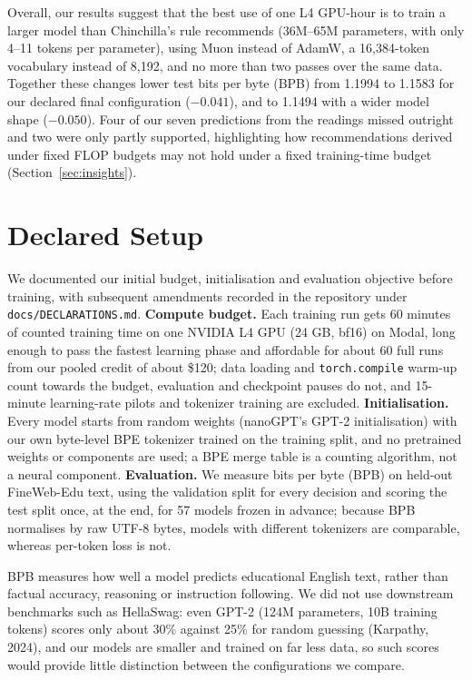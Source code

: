 \documentclass[11pt,a4paper]{article}
\begin{document}
Overall, our results suggest that the best use of one L4 GPU-hour is to train a larger model than Chinchilla's rule recommends (36M--65M parameters, with only 4--11 tokens per parameter), using Muon instead of AdamW, a 16,384-token vocabulary instead of 8,192, and no more than two passes over the same data. Together these changes lower test bits per byte (BPB) from 1.1994 to 1.1583 for our declared final configuration ($-0.041$), and to 1.1494 with a wider model shape ($-0.050$). Four of our seven predictions from the readings missed outright and two were only partly supported, highlighting how recommendations derived under fixed FLOP budgets may not hold under a fixed training-time budget (Section~\ref{sec:insights}).

\section{Declared Setup}\label{sec:setup}

We documented our initial budget, initialisation and evaluation objective before training, with subsequent amendments recorded in the repository under \texttt{docs/DECLARATIONS.md}. \textbf{Compute budget.} Each training run gets 60 minutes of counted training time on one NVIDIA L4 GPU (24 GB, bf16) on Modal, long enough to pass the fastest learning phase and affordable for about 60 full runs from our pooled credit of about \$120; data loading and \texttt{torch.compile} warm-up count towards the budget, evaluation and checkpoint pauses do not, and 15-minute learning-rate pilots and tokenizer training are excluded. \textbf{Initialisation.} Every model starts from random weights (nanoGPT's GPT-2 initialisation) with our own byte-level BPE tokenizer trained on the training split, and no pretrained weights or components are used; a BPE merge table is a counting algorithm, not a neural component. \textbf{Evaluation.} We measure bits per byte (BPB) on held-out FineWeb-Edu text, using the validation split for every decision and scoring the test split once, at the end, for 57 models frozen in advance; because BPB normalises by raw UTF-8 bytes, models with different tokenizers are comparable, whereas per-token loss is not.

BPB measures how well a model predicts educational English text, rather than factual accuracy, reasoning or instruction following. We did not use downstream benchmarks such as HellaSwag: even GPT-2 (124M parameters, 10B training tokens) scores only about 30\% against 25\% for random guessing (Karpathy, 2024), and our models are smaller and trained on far less data, so such scores would provide little distinction between the configurations we compare.
\end{document}
